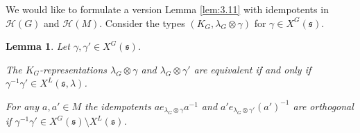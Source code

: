 \documentclass[11pt]{amsart}
\newtheorem{lem}[thm]{Lemma}
\theoremstyle{definition}
\begin{document}
We would like to formulate a version Lemma \ref{lem:3.11} with idempotents
in ${{\mathcal H}} (G)$ and ${{\mathcal H}} (M)$. Consider the types $(K_G,\lambda_G \otimes \gamma)$ for
$\gamma \in X^G ({{\mathfrak s}})$. 

\begin{lem}\label{lem:4.11}
Let $\gamma, \gamma' \in X^G ({{\mathfrak s}})$.
{\begin{enumerate} {{
\item The $K_G$-representations $\lambda_G \otimes \gamma$ and $\lambda_G \otimes \gamma'$ 
are equivalent if and only if $\gamma^{-1} \gamma' \in X^L ({{\mathfrak s}},\lambda)$.
\item For any $a,a' \in M$ the idempotents $a e_{\lambda_G \otimes \gamma} 
a^{-1}$ and $a' e_{\lambda_G \otimes \gamma'} (a')^{-1}$ are orthogonal if
$\gamma^{-1} \gamma' \in X^G ({{\mathfrak s}}) \setminus X^L ({{\mathfrak s}})$.
}} \end{enumerate}}
\end{lem}
\end{document}
